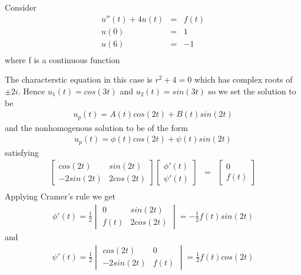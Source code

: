 \documentclass[11pt]{SelfArxOneColBMN}
\begin{document}
\begin{exercise}
 Consider
  \begin{eqnarray*}
    u''(t) + 4u(t) &=& f(t)\\
    u(0) &=& 1\\
    u(6) &=& -1\\
  \end{eqnarray*}
  where f is a continuous function
  \begin{solution}
    The characterstic equation in this case is $r^2 + 4 = 0$ which has complex roots of $\pm 2i$. Hence $u_1(t) = cos(3t)$ and $u_2(t) = sin(3t)$ so we set the solution to be
    \begin{eqnarray*}
      u_p(t) = A(t)cos(2t) + B(t)sin(2t)
    \end{eqnarray*}
    and the nonhomogenous solution to be of the form
    \begin{eqnarray*}
      u_p(t) = \phi(t)cos(2t) + \psi(t)sin(2t)
    \end{eqnarray*}
    satisfying
    \begin{eqnarray*}
      \begin{bmatrix}
        cos(2t) & sin(2t) \\
        -2sin(2t) & 2cos(2t)
      \end{bmatrix}
      \begin{bmatrix}
        \phi'(t) \\
        \psi'(t)
      \end{bmatrix}
      &=&
      \begin{bmatrix}
        0 \\
        f(t)
      \end{bmatrix}
      \\
    \end{eqnarray*}
    Applying Cramer's rule we get
    \begin{eqnarray*}
      \phi'(t) = \frac{1}{2}
      \begin{vmatrix}
        0 & sin(2t) \\
        f(t) & 2cos(2t)
      \end{vmatrix}
      = -\frac{1}{2}f(t)sin(2t)
    \end{eqnarray*}
    and
    \begin{eqnarray*}
      \psi'(t) = \frac{1}{2}
      \begin{vmatrix}
        cos(2t) & 0 \\
        -2sin(2t) & f(t)
      \end{vmatrix}
      = \frac{1}{2}f(t)cos(2t)
    \end{eqnarray*}

\end{solution}
\end{exercise}
\end{document}

